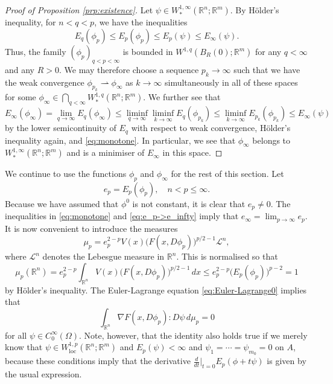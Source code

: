 \documentclass[a4paper]{article}
\newcommand{\R}{\mathbb{R}}
\newcommand{\Le}{\mathcal{L}}
\newcommand{\loc}{\mathrm{loc}}
\newcommand{\grad}{\nabla}
\theoremstyle{definition}
\theoremstyle{remark}
\begin{document}
\begin{proof}[Proof of Proposition \ref{prp:existence}]
Let $\psi \in W_*^{1, \infty}(\R^n; \R^m)$. By H\"older's inequality,
for $n < q < p$, we have the inequalities
\begin{equation} \label{eq:monotone}
E_q(\phi_p) \le E_p(\phi_p) \le E_p(\psi) \le E_\infty(\psi).
\end{equation}
Thus, the family $(\phi_p)_{q < p < \infty}$ is bounded in
$W^{1, q}(B_R(0); \R^m)$ for any $q < \infty$ and any $R > 0$. We may
therefore choose a sequence $p_k \to \infty$ such that we have the
weak convergence $\phi_{p_k} \rightharpoonup \phi_\infty$ as $k \to \infty$
simultaneously in all of these spaces for some $\phi_\infty \in \bigcap_{q < \infty} W_*^{1, q}(\R^n; \R^m)$. We further see that
\begin{equation} \label{eq:e_p->e_infty}
E_\infty(\phi_\infty) = \lim_{q \to \infty} E_q(\phi_\infty) \le \liminf_{q \to \infty} \liminf_{k \to \infty} E_q(\phi_{p_k}) \le \liminf_{k \to \infty} E_{p_k}(\phi_{p_k}) \le E_\infty(\psi)
\end{equation}
by the lower semicontinuity of $E_q$ with respect to weak convergence,
H\"older's inequality again, and \eqref{eq:monotone}. In particular, we
see that $\phi_\infty$ belongs to $W_*^{1, \infty}(\R^n; \R^m)$
and is a minimiser of $E_\infty$ in this space.
\end{proof}

We continue to use the functions $\phi_p$ and $\phi_\infty$ for the rest of this section. Let
\[
e_p = E_p(\phi_p), \quad n < p \le \infty.
\]
Because we have assumed that $\phi^0$ is not constant, it is clear that
$e_p \neq 0$. The inequalities in \eqref{eq:monotone} and \eqref{eq:e_p->e_infty} imply that
$e_\infty = \lim_{p \to \infty} e_p$. It is now convenient to introduce the measures
\[
\mu_p = e_p^{2 - p} V(x) \bigl(F(x, D\phi_p)\bigr)^{p/2 - 1} \Le^n,
\]
where $\Le^n$ denotes the Lebesgue measure in $\R^n$. This is normalised so that
\[
\mu_p(\R^n) = e_p^{2 - p} \int_{\R^n} V(x) \bigl(F(x, D\phi_p)\bigr)^{p/2 - 1} \, dx \le e_p^{2 - p} \bigl(E_p(\phi_p)\bigr)^{p - 2} = 1
\]
by H\"older's inequality. The Euler-Lagrange equation \eqref{eq:Euler-Lagrange0} implies that
\begin{equation} \label{eq:Euler-Lagrange}
\int_{\R^n} \grad F(x, D\phi_p) : D\psi \, d\mu_p = 0
\end{equation}
for all $\psi \in C_0^\infty(\Omega)$. Note, however, that the identity also holds true
if we merely know that $\psi \in W_\loc^{1, p}(\R^n; \R^m)$ and $E_p(\psi) < \infty$ and
$\psi_1 = \dotsb = \psi_{m_0} = 0$ on $A$, because these conditions imply that the derivative
$\frac{d}{dt}|_{t = 0} E_p(\phi + t\psi)$ is given by the usual expression.
\end{document}
